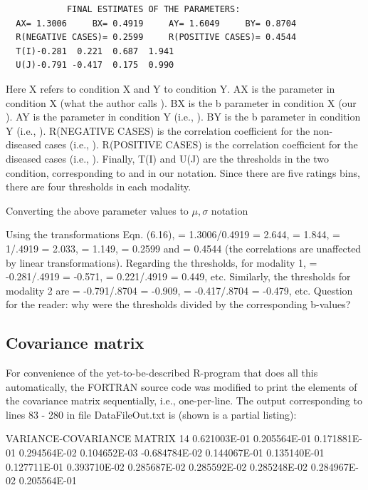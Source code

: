 \documentclass[
]{book}
\begin{document}
\begin{verbatim}
            FINAL ESTIMATES OF THE PARAMETERS:
  AX= 1.3006     BX= 0.4919     AY= 1.6049     BY= 0.8704
  R(NEGATIVE CASES)= 0.2599     R(POSITIVE CASES)= 0.4544
  T(I)-0.281  0.221  0.687  1.941
  U(J)-0.791 -0.417  0.175  0.990
\end{verbatim}

Here X refers to condition X and Y to condition Y. AX is the parameter in condition X (what the author calls ). BX is the b parameter in condition X (our ). AY is the parameter in condition Y (i.e., ). BY is the b parameter in condition Y (i.e., ). R(NEGATIVE CASES) is the correlation coefficient for the non-diseased cases (i.e., ). R(POSITIVE CASES) is the correlation coefficient for the diseased cases (i.e., ). Finally, T(I) and U(J) are the thresholds in the two condition, corresponding to and in our notation. Since there are five ratings bins, there are four thresholds in each modality.

Converting the above parameter values to \(\mu, \sigma\) notation

Using the transformations Eqn. (6.16), = 1.3006/0.4919 = 2.644, = 1.844, = 1/.4919 = 2.033, = 1.149, = 0.2599 and = 0.4544 (the correlations are unaffected by linear transformations). Regarding the thresholds, for modality 1, = -0.281/.4919 = -0.571, = 0.221/.4919 = 0.449, etc. Similarly, the thresholds for modality 2 are = -0.791/.8704 = -0.909, = -0.417/.8704 = -0.479, etc. Question for the reader: why were the thresholds divided by the corresponding b-values?

\hypertarget{bivariate-binormal-model-corroc2-covariance-matrix}{%
\subsection{Covariance matrix}\label{bivariate-binormal-model-corroc2-covariance-matrix}}

For convenience of the yet-to-be-described R-program that does all this automatically, the FORTRAN source code was modified to print the elements of the covariance matrix sequentially, i.e., one-per-line. The output corresponding to lines 83 - 280 in file DataFileOut.txt is (shown is a partial listing):

VARIANCE-COVARIANCE MATRIX
14
0.621003E-01
0.205564E-01
0.171881E-01
0.294564E-02
0.104652E-03
-0.684784E-02
0.144067E-01
0.135140E-01
0.127711E-01
0.393710E-02
0.285687E-02
0.285592E-02
0.285248E-02
0.284967E-02
0.205564E-01
\end{document}
